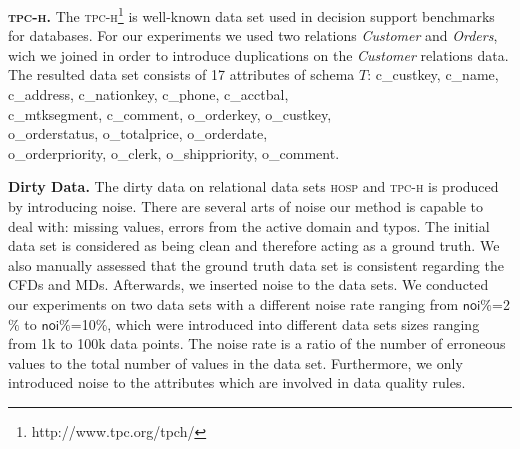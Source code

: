 \textbf{\textsc{tpc-h}.} The \textsc{tpc-h}\footnote{http://www.tpc.org/tpch/} is well-known data set used in decision support benchmarks for databases. For our experiments we used two relations \textit{Customer} and \textit{Orders}, wich we joined in order to introduce duplications on the \textit{Customer} relations data. The resulted data set consists of 17 attributes of schema $T$: \textsf{c\_custkey}, \textsf{c\_name}, \textsf{c\_address},  \textsf{c\_nationkey}, \textsf{c\_phone}, \textsf{c\_acctbal},\\ \textsf{c\_mtksegment}, \textsf{c\_comment}, \textsf{o\_orderkey}, \textsf{o\_custkey},\\ \textsf{o\_orderstatus}, \textsf{o\_totalprice}, \textsf{o\_orderdate},\\ \textsf{o\_orderpriority}, \textsf{o\_clerk}, \textsf{o\_shippriority}, \textsf{o\_comment}. 

\textbf{Dirty Data.} The dirty data on relational data sets \textsc{hosp} and \textsc{tpc-h} is produced by introducing noise. There are several arts of noise our method is capable to deal with: missing values, errors from the active domain and typos. The initial data set is considered as being clean and therefore acting as a ground truth. We also manually assessed that the ground truth data set is consistent regarding the CFDs and MDs. Afterwards, we inserted noise to the data sets. We conducted our experiments on two data sets with a different noise rate ranging from $\mathsf{noi\%}$=2$\%$ to $\mathsf{noi\%}$=10$\%$, which were introduced into different data sets sizes ranging from 1k to 100k data points. The noise rate is a ratio of the number of erroneous values to the total number of values in the data set. Furthermore, we only introduced noise to the attributes which are involved in data quality rules.

